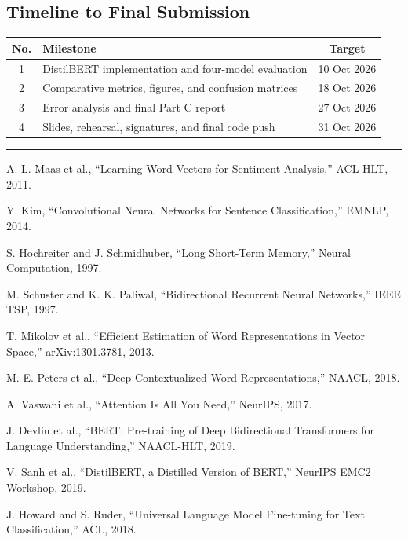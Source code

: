 \documentclass[10pt,a4paper]{article}
\begin{document}
\subsection*{Timeline to Final Submission}
\begin{table}[H]
\centering\small\renewcommand{\arraystretch}{1.2}
\begin{tabularx}{\textwidth}{c X c}
\toprule
\textbf{No.} & \textbf{Milestone} & \textbf{Target} \\
\midrule
1 & DistilBERT implementation and four-model evaluation & 10 Oct 2026 \\
2 & Comparative metrics, figures, and confusion matrices & 18 Oct 2026 \\
3 & Error analysis and final Part C report & 27 Oct 2026 \\
4 & Slides, rehearsal, signatures, and final code push & 31 Oct 2026 \\
\bottomrule
\end{tabularx}
\end{table}

\vspace{0.5cm}\noindent\rule{\textwidth}{0.4pt}
\vspace{0.3cm}
\begin{enumerate}[label={[$\arabic*]}, nosep, leftmargin=1.5em, font=\small]
\item A. L. Maas et al., ``Learning Word Vectors for Sentiment Analysis,'' ACL-HLT, 2011.
\item Y. Kim, ``Convolutional Neural Networks for Sentence Classification,'' EMNLP, 2014.
\item S. Hochreiter and J. Schmidhuber, ``Long Short-Term Memory,'' Neural Computation, 1997.
\item M. Schuster and K. K. Paliwal, ``Bidirectional Recurrent Neural Networks,'' IEEE TSP, 1997.
\item T. Mikolov et al., ``Efficient Estimation of Word Representations in Vector Space,'' arXiv:1301.3781, 2013.
\item M. E. Peters et al., ``Deep Contextualized Word Representations,'' NAACL, 2018.
\item A. Vaswani et al., ``Attention Is All You Need,'' NeurIPS, 2017.
\item J. Devlin et al., ``BERT: Pre-training of Deep Bidirectional Transformers for Language Understanding,'' NAACL-HLT, 2019.
\item V. Sanh et al., ``DistilBERT, a Distilled Version of BERT,'' NeurIPS EMC2 Workshop, 2019.
\item J. Howard and S. Ruder, ``Universal Language Model Fine-tuning for Text Classification,'' ACL, 2018.
\end{enumerate}
\end{document}
